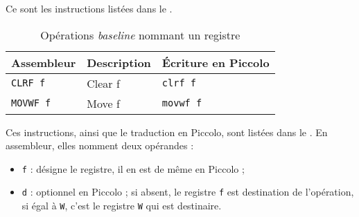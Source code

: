 
Ce sont les instructions listées dans le .



\begin{table}[!ht]
  \centering
  \small
  \begin{tabular}{lll}
    \textbf{Assembleur} & \textbf{Description} & \textbf{Écriture en Piccolo}\\
    \hline
    \texttt{CLRF f} & Clear f & \texttt{clrf f} \\
    \texttt{MOVWF f} & Move f & \texttt{movwf f} \\
  \hline
  \end{tabular}
  \caption{Opérations \emph{baseline} nommant un registre}
\end{table}









Ces instructions, ainsi que le traduction en Piccolo, sont listées dans le . En assembleur, elles nomment deux opérandes :
\begin{itemize}
  \item \texttt{f} : désigne le registre, il en est de même en Piccolo ;
  \item \texttt{d} : optionnel en Piccolo ; si absent, le registre \texttt{f} est destination de l'opération, si égal à \texttt{W}, c'est le registre \texttt{W} qui est destinaire.
\end{itemize}


